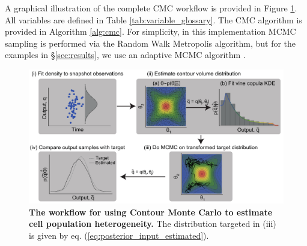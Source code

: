 A graphical illustration of the complete CMC workflow is provided in Figure \ref{fig:workflow}. All variables are defined in Table \ref{tab:variable_glossary}. The CMC algorithm is provided in Algorithm \ref{alg:cmc}. For simplicity, in this implementation MCMC sampling is performed via the Random Walk Metropolis algorithm, but for the examples in \S \ref{sec:results}, we use an adaptive MCMC algorithm \cite{johnstone2016uncertainty}.

\begin{figure}[H]
\centerline{\includegraphics[width=1.5\textwidth]{../figures/workflow.pdf}}
\caption{\textbf{The workflow for using Contour Monte Carlo to estimate cell population heterogeneity.}
The distribution targeted in (iii) is given by eq. (\ref{eq:posterior_input_estimated}).}\label{fig:workflow}
\end{figure}

